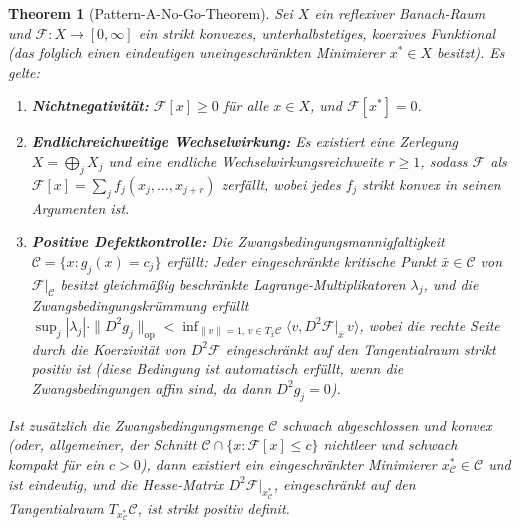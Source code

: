 \documentclass[12pt,a4paper]{article}
\newtheorem{theorem}{Theorem}[section]
\theoremstyle{definition}
\theoremstyle{remark}
\begin{document}
\begin{theorem}[Pattern-A-No-Go-Theorem]\label{thm:no-go}
Sei $X$ ein reflexiver Banach-Raum und $\mathcal{F} \colon X \to [0,\infty]$ ein strikt konvexes, unterhalbstetiges, koerzives Funktional \textup{(}das folglich einen eindeutigen uneingeschränkten Minimierer $x^* \in X$ besitzt\textup{)}. Es gelte:
\begin{enumerate}[label=\textup{(\roman*)}]
  \item \textbf{Nichtnegativität:}
    $\mathcal{F}[x] \ge 0$ für alle $x \in X$, und $\mathcal{F}[x^*] = 0$.
  \item \textbf{Endlichreichweitige Wechselwirkung:} Es existiert eine Zerlegung
    $X = \bigoplus_{j} X_j$ und eine endliche Wechselwirkungsreichweite $r \ge 1$, sodass $\mathcal{F}$ als
    $\mathcal{F}[x] = \sum_j f_j(x_j, \ldots, x_{j+r})$ zerfällt, wobei jedes $f_j$ strikt konvex in seinen Argumenten ist.
  \item \textbf{Positive Defektkontrolle:} Die Zwangsbedingungsmannigfaltigkeit
    $\mathcal{C} = \{x : g_j(x) = c_j\}$ erfüllt:
    Jeder eingeschränkte kritische Punkt $\bar{x} \in \mathcal{C}$ von $\mathcal{F}|_{\mathcal{C}}$ besitzt
    gleichmäßig beschränkte Lagrange-Multiplikatoren $\lambda_j$,
    und die Zwangsbedingungskrümmung erfüllt
    $\sup_j |\lambda_j| \cdot \|D^2 g_j\|_{\mathrm{op}} < \inf_{\|v\|=1,\, v \in T_{\bar{x}}\mathcal{C}} \langle v, D^2\mathcal{F}|_{\bar{x}}\, v\rangle$,
    wobei die rechte Seite durch die Koerzivität von $D^2\mathcal{F}$ eingeschränkt auf den Tangentialraum strikt positiv ist
    \textup{(}diese Bedingung ist automatisch erfüllt, wenn die
    Zwangsbedingungen affin sind, da dann $D^2 g_j = 0$\textup{)}.
\end{enumerate}
Ist zusätzlich die Zwangsbedingungsmenge $\mathcal{C}$ schwach abgeschlossen und konvex \textup{(}oder, allgemeiner,
der Schnitt $\mathcal{C} \cap \{x : \mathcal{F}[x] \le c\}$ nichtleer und schwach kompakt für ein
$c > 0$\textup{)}, dann existiert ein eingeschränkter Minimierer $x^*_{\mathcal{C}} \in \mathcal{C}$ und ist eindeutig, und die Hesse-Matrix
$D^2\mathcal{F}|_{x^*_{\mathcal{C}}}$, eingeschränkt auf den Tangentialraum $T_{x^*_{\mathcal{C}}}\mathcal{C}$,
ist strikt positiv definit.
\end{theorem}
\end{document}
